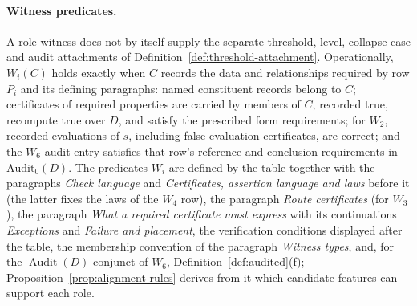 \documentclass[11pt]{article}
\theoremstyle{definition}
\newcommand{\Audit}[1]{\ensuremath{\operatorname{Audit}\!\left(#1\right)}}
\begin{document}
\paragraph{Witness predicates.}\label{par:witness-predicates} A role witness does not by
itself supply the separate threshold, level, collapse-case and audit
attachments of Definition~\ref{def:threshold-attachment}. Operationally, \(W_i(C)\) holds exactly when \(C\) records the data and relationships required by row \(P_i\) and its defining paragraphs: named constituent records belong to \(C\); certificates of required properties are carried by members of \(C\), recorded true, recompute true over \(D\), and satisfy the prescribed form requirements; for \(W_2\), recorded evaluations of \(s\), including false evaluation certificates, are correct; and the \(W_6\) audit entry satisfies that row's reference and conclusion requirements in \(\mathrm{Audit}_0(D)\). The predicates \(W_i\) are
defined by the table together with the paragraphs \emph{Check language} and \emph{Certificates, assertion language and laws} before it (the latter fixes the laws of the \(W_4\) row), the paragraph \emph{Route certificates} (for \(W_3\)), the paragraph \emph{What a required
certificate must express} with its continuations \emph{Exceptions} and \emph{Failure and placement}, the verification conditions displayed after the
table, the membership convention of the paragraph \emph{Witness types}, and, for the \(\Audit{D}\) conjunct of \(W_6\), Definition~\ref{def:audited}(f); Proposition~\ref{prop:alignment-rules}
derives from it which candidate features can support each role.
\end{document}
